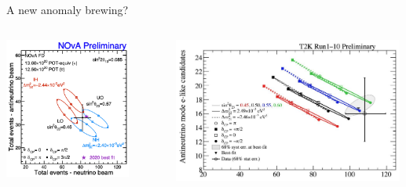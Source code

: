 \begin{frame}{A new anomaly brewing?}

  \begin{columns}[T]
    \begin{column}{0.40\textwidth}
      \begin{center}
         \includegraphics[width=0.80\textwidth]{./images/3nu/accelerator/nova_biprob_data}\\
      \end{center}
    \end{column}
    \begin{column}{0.60\textwidth}
      \begin{center}
         \includegraphics[width=0.99\textwidth]{./images/3nu/accelerator/t2k_biprob_data}\\
      \end{center}
    \end{column}
  \end{columns}

\end{frame}

